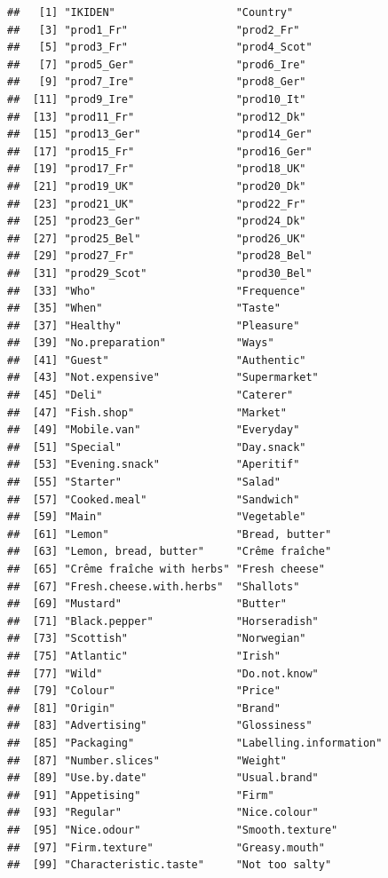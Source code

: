 \documentclass[
]{book}
\begin{document}
\begin{verbatim}
##   [1] "IKIDEN"                   "Country"                 
##   [3] "prod1_Fr"                 "prod2_Fr"                
##   [5] "prod3_Fr"                 "prod4_Scot"              
##   [7] "prod5_Ger"                "prod6_Ire"               
##   [9] "prod7_Ire"                "prod8_Ger"               
##  [11] "prod9_Ire"                "prod10_It"               
##  [13] "prod11_Fr"                "prod12_Dk"               
##  [15] "prod13_Ger"               "prod14_Ger"              
##  [17] "prod15_Fr"                "prod16_Ger"              
##  [19] "prod17_Fr"                "prod18_UK"               
##  [21] "prod19_UK"                "prod20_Dk"               
##  [23] "prod21_UK"                "prod22_Fr"               
##  [25] "prod23_Ger"               "prod24_Dk"               
##  [27] "prod25_Bel"               "prod26_UK"               
##  [29] "prod27_Fr"                "prod28_Bel"              
##  [31] "prod29_Scot"              "prod30_Bel"              
##  [33] "Who"                      "Frequence"               
##  [35] "When"                     "Taste"                   
##  [37] "Healthy"                  "Pleasure"                
##  [39] "No.preparation"           "Ways"                    
##  [41] "Guest"                    "Authentic"               
##  [43] "Not.expensive"            "Supermarket"             
##  [45] "Deli"                     "Caterer"                 
##  [47] "Fish.shop"                "Market"                  
##  [49] "Mobile.van"               "Everyday"                
##  [51] "Special"                  "Day.snack"               
##  [53] "Evening.snack"            "Aperitif"                
##  [55] "Starter"                  "Salad"                   
##  [57] "Cooked.meal"              "Sandwich"                
##  [59] "Main"                     "Vegetable"               
##  [61] "Lemon"                    "Bread, butter"           
##  [63] "Lemon, bread, butter"     "Crême fraîche"           
##  [65] "Crême fraîche with herbs" "Fresh cheese"            
##  [67] "Fresh.cheese.with.herbs"  "Shallots"                
##  [69] "Mustard"                  "Butter"                  
##  [71] "Black.pepper"             "Horseradish"             
##  [73] "Scottish"                 "Norwegian"               
##  [75] "Atlantic"                 "Irish"                   
##  [77] "Wild"                     "Do.not.know"             
##  [79] "Colour"                   "Price"                   
##  [81] "Origin"                   "Brand"                   
##  [83] "Advertising"              "Glossiness"              
##  [85] "Packaging"                "Labelling.information"   
##  [87] "Number.slices"            "Weight"                  
##  [89] "Use.by.date"              "Usual.brand"             
##  [91] "Appetising"               "Firm"                    
##  [93] "Regular"                  "Nice.colour"             
##  [95] "Nice.odour"               "Smooth.texture"          
##  [97] "Firm.texture"             "Greasy.mouth"            
##  [99] "Characteristic.taste"     "Not too salty"
\end{verbatim}
\end{document}
